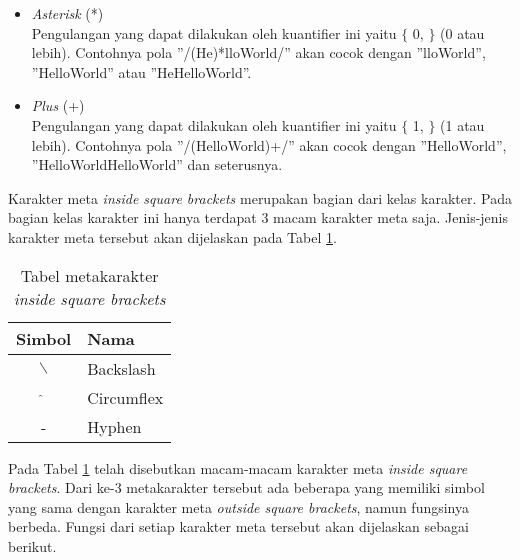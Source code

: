 \begin{enumerate}
\begin{itemize}
		\item \textit{Asterisk} (*) \\
		Pengulangan yang dapat dilakukan oleh kuantifier ini yaitu $\lbrace$ 0, $\rbrace$ (0 atau lebih). Contohnya pola ''/(He)*lloWorld/'' akan cocok dengan ''lloWorld'', ''HelloWorld'' atau ''HeHelloWorld''.
		 
		\item \textit{Plus} (+) \\
		Pengulangan yang dapat dilakukan oleh kuantifier ini yaitu $\lbrace$ 1, $\rbrace$ (1 atau lebih). Contohnya pola ''/(HelloWorld)+/'' akan cocok dengan ''HelloWorld'', ''HelloWorldHelloWorld'' dan seterusnya.
	\end{itemize}	 
	
\end{enumerate}
		
Karakter meta \textit{inside square brackets} merupakan bagian dari kelas karakter. Pada bagian kelas karakter ini hanya terdapat 3 macam karakter meta saja. Jenis-jenis karakter meta tersebut akan dijelaskan pada Tabel \ref{tab:metacharacters-inside}.
		
\begin{table}[H]
	\renewcommand{\arraystretch}{1.5}
	\caption {Tabel metakarakter \textit{inside square brackets}} 
	\label{tab:metacharacters-inside}
	\begin{center}
		\begin{tabular}{|c|l|}
		\hline 
		Simbol & Nama \\ 
		\hline 
		$\backslash$ & Backslash \\ 
		\hline 
		$\hat{}$ & Circumflex \\ 
		\hline 
		- & Hyphen \\ 
		\hline
		\end{tabular}
	\end{center}
\end{table}

Pada Tabel \ref{tab:metacharacters-inside} telah disebutkan macam-macam karakter meta \textit{inside square brackets}. Dari ke-3 metakarakter tersebut ada beberapa yang memiliki simbol yang sama dengan karakter meta \textit{outside square brackets}, namun fungsinya berbeda. Fungsi dari setiap karakter meta tersebut akan dijelaskan sebagai berikut.

